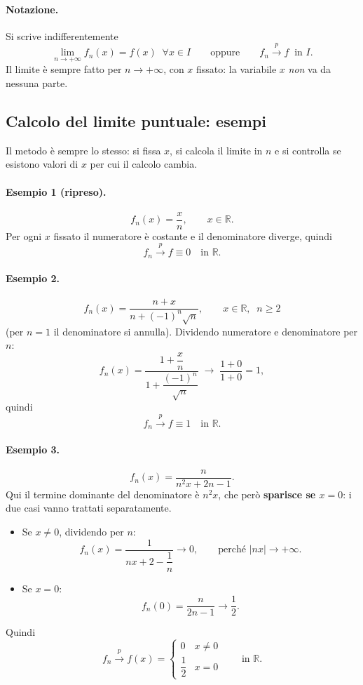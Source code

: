 \paragraph{Notazione.} Si scrive indifferentemente
\[
  \lim_{n \to +\infty} f_n(x) = f(x) \;\; \forall x \in I
  \qquad \text{oppure} \qquad
  f_n \xrightarrow{\;p\;} f \;\; \text{in } I .
\]
Il limite è sempre fatto per $n \to +\infty$, con $x$ fissato: la variabile $x$
\emph{non} va da nessuna parte.

\subsection{Calcolo del limite puntuale: esempi}

Il metodo è sempre lo stesso: si fissa $x$, si calcola il limite in $n$ e si
controlla se esistono valori di $x$ per cui il calcolo cambia.

\paragraph{Esempio 1 (ripreso).}
\[
  f_n(x) = \frac{x}{n}, \qquad x \in \mathbb{R}.
\]
Per ogni $x$ fissato il numeratore è costante e il denominatore diverge, quindi
\[
  f_n \xrightarrow{\;p\;} f \equiv 0 \quad \text{in } \mathbb{R} .
\]

\paragraph{Esempio 2.}
\[
  f_n(x) = \frac{n + x}{n + (-1)^n \sqrt{n}}, \qquad x \in \mathbb{R}, \;\; n \ge 2
\]
(per $n = 1$ il denominatore si annulla). Dividendo numeratore e denominatore
per $n$:
\[
  f_n(x) = \frac{1 + \dfrac{x}{n}}{1 + \dfrac{(-1)^n}{\sqrt{n}}}
  \;\longrightarrow\; \frac{1 + 0}{1 + 0} = 1 ,
\]
quindi
\[
  f_n \xrightarrow{\;p\;} f \equiv 1 \quad \text{in } \mathbb{R} .
\]

\paragraph{Esempio 3.}
\[
  f_n(x) = \frac{n}{n^2 x + 2n - 1} .
\]
Qui il termine dominante del denominatore è $n^2 x$, che però \textbf{sparisce
se $x = 0$}: i due casi vanno trattati separatamente.
\begin{itemize}
  \item Se $x \neq 0$, dividendo per $n$:
  \[
    f_n(x) = \frac{1}{n x + 2 - \dfrac{1}{n}} \longrightarrow 0 ,
    \qquad \text{perché } |n x| \to +\infty .
  \]
  \item Se $x = 0$:
  \[
    f_n(0) = \frac{n}{2n - 1} \longrightarrow \frac{1}{2} .
  \]
\end{itemize}
Quindi
\[
  f_n \xrightarrow{\;p\;} f(x) =
  \begin{cases}
    0           & x \neq 0 \\[2pt]
    \dfrac{1}{2} & x = 0
  \end{cases}
  \qquad \text{in } \mathbb{R} .
\]

